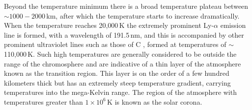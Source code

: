 Beyond the temperature minimum there is a broad temperature plateau between $\sim$$1000-2000$\,km, after which the temperature starts to increase dramatically. When the temperature reaches 20,000\,K the extremely prominent Ly-$\alpha$ emission line is formed, with a wavelength of 191.5\,nm, and this is accompanied by other prominent ultraviolet lines such as those of C , formed at temperatures of $\sim$110,000\,K. Such high temperatures are generally considered to be outside the range of the chromosphere and are indicative of a thin layer of the atmosphere known as the transition region. This layer is on the order of a few hundred kilometers thick but has an extremely steep temperature gradient, carrying temperatures into the mega-Kelvin range. The region of the atmosphere with temperatures greater than $1\times10^{6}$\,K is known as the solar corona.







